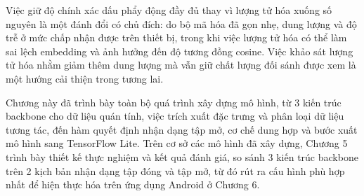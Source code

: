 \documentclass[../DoAn.tex]{subfiles}
\begin{document}
Việc giữ độ chính xác dấu phẩy động đầy đủ thay vì lượng tử hóa xuống số nguyên là một đánh đổi có chủ đích: do bộ mã hóa đã gọn nhẹ, dung lượng và độ trễ ở mức chấp nhận được trên thiết bị, trong khi việc lượng tử hóa có thể làm sai lệch embedding và ảnh hưởng đến độ tương đồng cosine. Việc khảo sát lượng tử hóa nhằm giảm thêm dung lượng mà vẫn giữ chất lượng đối sánh được xem là một hướng cải thiện trong tương lai.

Chương này đã trình bày toàn bộ quá trình xây dựng mô hình, từ 3 kiến trúc backbone cho dữ liệu quán tính, việc trích xuất đặc trưng và phân loại dữ liệu tương tác, đến hàm quyết định nhận dạng tập mở, cơ chế dung hợp và bước xuất mô hình sang TensorFlow Lite. Trên cơ sở các mô hình đã xây dựng, Chương 5 trình bày thiết kế thực nghiệm và kết quả đánh giá, so sánh 3 kiến trúc backbone trên 2 kịch bản nhận dạng tập đóng và tập mở, từ đó rút ra cấu hình phù hợp nhất để hiện thực hóa trên ứng dụng Android ở Chương 6.
\end{document}
